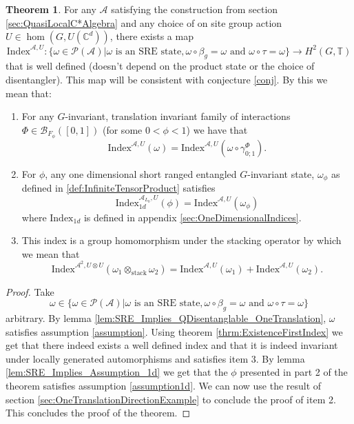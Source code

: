 \documentclass[12pt,a4paper,twoside]{article}
\newcommand{\BB}{\mathcal B}
\newcommand{\PP}{\mathcal P}
\newcommand{\CC}{\mathbb C}
\newcommand{\TT}{\mathbb T}
\renewcommand{\AA}{\mathcal A}
\theoremstyle{definition}
\newtheorem{theorem}{Theorem}[section]
\numberwithin{equation}{section}
\begin{document}
\begin{theorem}
	For any $\AA$ satisfying the construction from section \ref{sec:QuasiLocalC*Algebra} and any choice of on site group action $U\in\hom(G,U(\CC^d))$, there exists a map
	\begin{equation}
		\textrm{Index}^{\AA,U}:\{\omega\in\PP(\AA)|\omega\text{ is an SRE state},\omega\circ\beta_g=\omega\text{ and }\omega\circ\tau=\omega\}\rightarrow H^2(G,\TT)
	\end{equation}
	that is well defined (doesn't depend on the product state or the choice of disentangler). This map will be consistent with conjecture \ref{conj}. By this we mean that:
	\begin{enumerate}
		\item For any $G$-invariant, translation invariant family of interactions $\Phi\in\BB_{F_{\phi}}([0,1])$ (for some $0<\phi<1$) we have that
		\begin{equation}
			\textrm{Index}^{\AA,U}(\omega)=\textrm{Index}^{\AA,U}(\omega\circ\gamma^{\Phi}_{0;1}).
		\end{equation}
		\item For $\phi$, any one dimensional short ranged entangled $G$-invariant state, $\omega_\phi$ as defined in \ref{def:InfiniteTensorProduct} satisfies
		\begin{equation}
			\textrm{Index}^{\AA_{L_0},U}_{1d}(\phi)=\textrm{Index}^{\AA,U}(\omega_\phi)
		\end{equation}
		where $\textrm{Index}_{1d}$ is defined in appendix \ref{sec:OneDimensionalIndices}.
		\item This index is a group homomorphism under the stacking operator by which we mean that
		\begin{equation}
			\textrm{Index}^{\AA^2,U\otimes U}(\omega_1\otimes_{\text{stack}}\omega_2)=\textrm{Index}^{\AA,U}(\omega_1)+\textrm{Index}^{\AA,U}(\omega_2).
		\end{equation}
	\end{enumerate}
\end{theorem}
\begin{proof}
	Take
	\begin{equation}
		\omega\in \{\omega\in\PP(\AA)|\omega\text{ is an SRE state},\omega\circ\beta_g=\omega\text{ and }\omega\circ\tau=\omega\}
	\end{equation}
	arbitrary. By lemma \ref{lem:SRE_Implies_QDisentanglable_OneTranslation}, $\omega$ satisfies assumption \ref{assumption}. Using theorem \ref{thrm:ExistenceFirstIndex} we get that there indeed exists a well defined index and that it is indeed invariant under locally generated automorphisms and satisfies item 3. By lemma \ref{lem:SRE_Implies_Assumption_1d} we get that the $\phi$ presented in part 2 of the theorem satisfies assumption \ref{assumption1d}. We can now use the result of section \ref{sec:OneTranslationDirectionExample} to conclude the proof of item 2. This concludes the proof of the theorem.
\end{proof}
\end{document}
